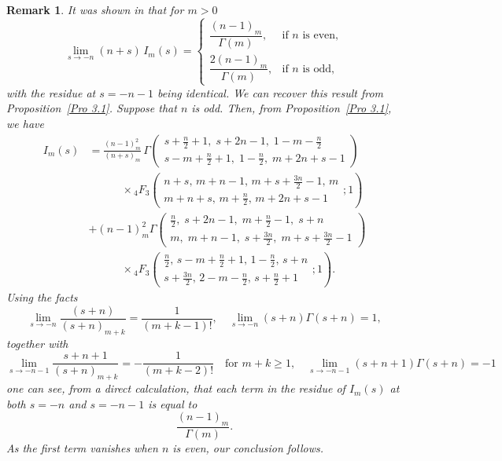 \documentclass{article}
\theoremstyle{boldremark}
\newtheorem{remark}[theorem]{Remark}
\renewcommand\[{\begin{equation}}
\renewcommand\]{\end{equation}}
\theoremstyle{definition}
\numberwithin{equation}{section}
\begin{document}
\begin{remark}\label{remark}
    It was shown in \cite[Proposition 1]{BEY2025} that for $m > 0$
    \begin{equation}\label{Dirichlet}
\lim_{s\rightarrow-n}(n+s)\,I_m(s) 
=
\begin{cases}
\dfrac{(n-1)_m}{\Gamma(m)}, & \text{if } n \text{ is even}, \\[2ex]
\dfrac{2(n-1)_m}{\Gamma(m)}, & \text{if } n \text{ is odd},
\end{cases}
\end{equation} 
with the residue at $s = -n-1$ being identical.
We can recover this result from Proposition~\ref{Pro 3.1}. Suppose that $n$ is odd. Then, from Proposition~\ref{Pro 3.1}, we have
\begin{align*} 
I_m(s) &= \frac{(n-1)_m^2}{(n+s)_m}\,
\Gamma\!\left(
\begin{matrix}
s+\frac{n}{2}+1,\; s+2n-1,\; 1-m-\frac{n}{2}
\\
s-m+\frac{n}{2}+1,\; 1-\frac{n}{2},\; m+2n+s-1
\end{matrix}
\right) \\
&\qquad \quad \times {}_4F_3 \left( \begin{matrix} n + s, \, m + n - 1, \, m + s + \frac{3n}{2} - 1, \, m \\ m + n + s, \, m + \frac{n}{2}, \, m + 2n + s - 1 \end{matrix} ; 1 \right) \nonumber \\[1em]
& + (n-1)_m^2  \Gamma\!\left(
\begin{matrix}
\frac{n}{2},\; s+2n-1,\; m+\frac{n}{2}-1,\; s+n
\\
m,\; m+n-1,\; s+\frac{3n}{2},\; m+s+\frac{3n}{2}-1
\end{matrix}
\right) \nonumber \\
&\qquad \quad \times {}_4F_3 \left( \begin{matrix} \frac{n}{2}, \, s - m + \frac{n}{2} + 1, \, 1 - \frac{n}{2}, \, s + n \\ s + \frac{3n}{2}, \, 2 - m - \frac{n}{2}, \, s + \frac{n}{2} + 1 \end{matrix} ; 1 \right) \nonumber.
\end{align*}
Using the facts
$$\lim_{s\rightarrow-n} \frac{(s+n)}{(s+n)_{m+k}} = \frac{1}{(m+k-1)!}, \quad \lim_{s\rightarrow-n} (s+n)\Gamma(s+n) = 1,$$
together with
$$\lim_{s\rightarrow-n-1} \frac{s+n+1}{(s+n)_{m+k}} = -\frac{1}{(m+k-2)!} \quad \text{for $m+k\geq1$}, \quad \lim_{s\rightarrow-n-1} (s+n+1)\Gamma(s+n) = -1$$
one can see, from a direct calculation, that each term in the residue of $I_m(s)$ at  both $s = -n$ and $s = -n-1$ is equal to 
$$
\frac{(n-1)_m}{\Gamma(m)}.
$$
As the first term vanishes when $n$ is even, our conclusion follows.
\end{remark}
\end{document}
